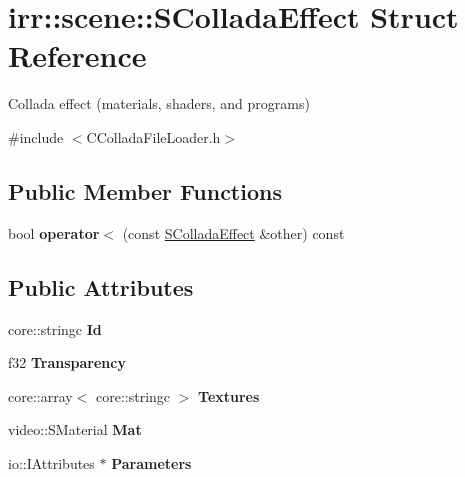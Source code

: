 \hypertarget{structirr_1_1scene_1_1_s_collada_effect}{\section{irr\-:\-:scene\-:\-:S\-Collada\-Effect Struct Reference}
\label{structirr_1_1scene_1_1_s_collada_effect}
}


Collada effect (materials, shaders, and programs)  




{\ttfamily \#include $<$C\-Collada\-File\-Loader.\-h$>$}

\subsection*{Public Member Functions}
\begin{DoxyCompactItemize}
\item 
\hypertarget{structirr_1_1scene_1_1_s_collada_effect_ac8c19d97a7ff9a53159ff7484d53a61b}{bool {\bfseries operator$<$} (const \hyperlink{structirr_1_1scene_1_1_s_collada_effect}{S\-Collada\-Effect} \&other) const }\label{structirr_1_1scene_1_1_s_collada_effect_ac8c19d97a7ff9a53159ff7484d53a61b}

\end{DoxyCompactItemize}
\subsection*{Public Attributes}
\begin{DoxyCompactItemize}
\item 
\hypertarget{structirr_1_1scene_1_1_s_collada_effect_afd4104c4576d50ee064df066eb7228d9}{core\-::stringc {\bfseries Id}}\label{structirr_1_1scene_1_1_s_collada_effect_afd4104c4576d50ee064df066eb7228d9}

\item 
\hypertarget{structirr_1_1scene_1_1_s_collada_effect_affac41aef7d74dc6e9ca4c531567bafd}{f32 {\bfseries Transparency}}\label{structirr_1_1scene_1_1_s_collada_effect_affac41aef7d74dc6e9ca4c531567bafd}

\item 
\hypertarget{structirr_1_1scene_1_1_s_collada_effect_ab0bb0a8f0c20294331c3cda902af1136}{core\-::array$<$ core\-::stringc $>$ {\bfseries Textures}}\label{structirr_1_1scene_1_1_s_collada_effect_ab0bb0a8f0c20294331c3cda902af1136}

\item 
\hypertarget{structirr_1_1scene_1_1_s_collada_effect_a0ea8e3818e9da3bdd1f747f1ce3b24f4}{video\-::\-S\-Material {\bfseries Mat}}\label{structirr_1_1scene_1_1_s_collada_effect_a0ea8e3818e9da3bdd1f747f1ce3b24f4}

\item 
\hypertarget{structirr_1_1scene_1_1_s_collada_effect_a607e941ff41ab29291f3eece448dce47}{io\-::\-I\-Attributes $\ast$ {\bfseries Parameters}}\label{structirr_1_1scene_1_1_s_collada_effect_a607e941ff41ab29291f3eece448dce47}

\end{DoxyCompactItemize}



